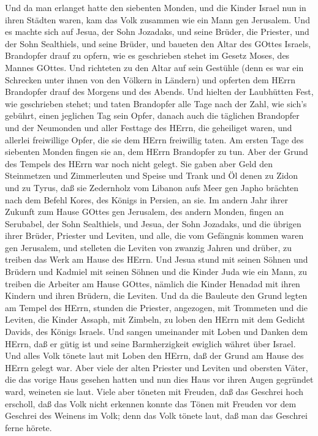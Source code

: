  Und da man erlanget hatte den siebenten Monden, und die
Kinder Israel nun in ihren Städten waren, kam das Volk zusammen wie ein
Mann gen Jerusalem.  Und es machte sich auf Jesua, der Sohn
Jozadaks, und seine Brüder, die Priester, und der Sohn Sealthiels, und
seine Brüder, und baueten den Altar des GOttes Israels, Brandopfer drauf
zu opfern, wie es geschrieben stehet im Gesetz Moses, des Mannes GOttes.
 Und richteten zu den Altar auf sein Gestühle (denn es war
ein Schrecken unter ihnen von den Völkern in Ländern) und opferten dem
HErrn Brandopfer drauf des Morgens und des Abends.  Und
hielten der Laubhütten Fest, wie geschrieben stehet; und taten
Brandopfer alle Tage nach der Zahl, wie sich's gebührt, einen jeglichen
Tag sein Opfer,  danach auch die täglichen Brandopfer und
der Neumonden und aller Festtage des HErrn, die geheiliget waren, und
allerlei freiwillige Opfer, die sie dem HErrn freiwillig taten.
 Am ersten Tage des siebenten Monden fingen sie an, dem
HErrn Brandopfer zu tun. Aber der Grund des Tempels des HErrn war noch
nicht gelegt.  Sie gaben aber Geld den Steinmetzen und
Zimmerleuten und Speise und Trank und Öl denen zu Zidon und zu Tyrus,
daß sie Zedernholz vom Libanon aufs Meer gen Japho brächten nach dem
Befehl Kores, des Königs in Persien, an sie.  Im andern Jahr
ihrer Zukunft zum Hause GOttes gen Jerusalem, des andern Monden, fingen
an Serubabel, der Sohn Sealthiels, und Jesua, der Sohn Jozadaks, und die
übrigen ihrer Brüder, Priester und Leviten, und alle, die vom Gefängnis
kommen waren gen Jerusalem, und stelleten die Leviten von zwanzig Jahren
und drüber, zu treiben das Werk am Hause des HErrn.  Und
Jesua stund mit seinen Söhnen und Brüdern und Kadmiel mit seinen Söhnen
und die Kinder Juda wie ein Mann, zu treiben die Arbeiter am Hause
GOttes, nämlich die Kinder Henadad mit ihren Kindern und ihren Brüdern,
die Leviten.  Und da die Bauleute den Grund legten am
Tempel des HErrn, stunden die Priester, angezogen, mit Trommeten und die
Leviten, die Kinder Assaph, mit Zimbeln, zu loben den HErrn mit dem
Gedicht Davids, des Königs Israels.  Und sangen umeinander
mit Loben und Danken dem HErrn, daß er gütig ist und seine
Barmherzigkeit ewiglich währet über Israel. Und alles Volk tönete laut
mit Loben den HErrn, daß der Grund am Hause des HErrn gelegt war.
 Aber viele der alten Priester und Leviten und obersten
Väter, die das vorige Haus gesehen hatten und nun dies Haus vor ihren
Augen gegründet ward, weineten sie laut. Viele aber töneten mit Freuden,
daß das Geschrei hoch erscholl,  daß das Volk nicht
erkennen konnte das Tönen mit Freuden vor dem Geschrei des Weinens im
Volk; denn das Volk tönete laut, daß man das Geschrei ferne hörete.

